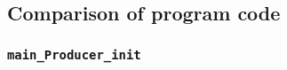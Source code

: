 % 

% 

% 

\subsection{Comparison of program code}
\label{Buffer-code-comparison-subsection}

\subsubsection{\texttt{main\_Producer\_init}}

